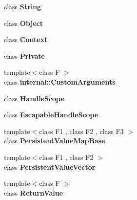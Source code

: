 \begin{DoxyCompactItemize}
\item 
class {\bfseries String}\hypertarget{classv8_1_1Local_a7fb804f7dc96dd9f705c84095f37f1ca}{}\label{classv8_1_1Local_a7fb804f7dc96dd9f705c84095f37f1ca}

\item 
class {\bfseries Object}\hypertarget{classv8_1_1Local_a0720b5f434e636e22a3ed34f847eec57}{}\label{classv8_1_1Local_a0720b5f434e636e22a3ed34f847eec57}

\item 
class {\bfseries Context}\hypertarget{classv8_1_1Local_ac26c806e60ca4a0547680edb68f6e39b}{}\label{classv8_1_1Local_ac26c806e60ca4a0547680edb68f6e39b}

\item 
class {\bfseries Private}\hypertarget{classv8_1_1Local_ac96b60d37bd806132da680e187dc2288}{}\label{classv8_1_1Local_ac96b60d37bd806132da680e187dc2288}

\item 
{\footnotesize template$<$class F $>$ }\\class {\bfseries internal\+::\+Custom\+Arguments}\hypertarget{classv8_1_1Local_a07108678a2af25caab612879ed7dca62}{}\label{classv8_1_1Local_a07108678a2af25caab612879ed7dca62}

\item 
class {\bfseries Handle\+Scope}\hypertarget{classv8_1_1Local_a5f127e488db492b05c8542cec0b880b7}{}\label{classv8_1_1Local_a5f127e488db492b05c8542cec0b880b7}

\item 
class {\bfseries Escapable\+Handle\+Scope}\hypertarget{classv8_1_1Local_ade20a528f8ee42d426959f061cff29ff}{}\label{classv8_1_1Local_ade20a528f8ee42d426959f061cff29ff}

\item 
{\footnotesize template$<$class F1 , class F2 , class F3 $>$ }\\class {\bfseries Persistent\+Value\+Map\+Base}\hypertarget{classv8_1_1Local_a08e2b8f164392d71811ce6cc134f33e3}{}\label{classv8_1_1Local_a08e2b8f164392d71811ce6cc134f33e3}

\item 
{\footnotesize template$<$class F1 , class F2 $>$ }\\class {\bfseries Persistent\+Value\+Vector}\hypertarget{classv8_1_1Local_a978bb1377559897d74d5fe883a54a315}{}\label{classv8_1_1Local_a978bb1377559897d74d5fe883a54a315}

\item 
{\footnotesize template$<$class F $>$ }\\class {\bfseries Return\+Value}\hypertarget{classv8_1_1Local_a53f604d3d6f2dc0647df33c9979f116a}{}\label{classv8_1_1Local_a53f604d3d6f2dc0647df33c9979f116a}


\end{DoxyCompactItemize}
